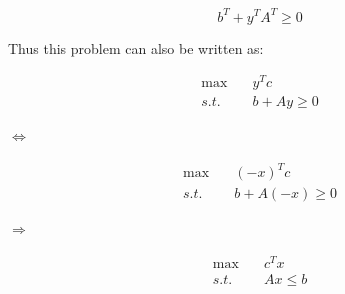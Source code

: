 \begin{equation*}
b^T+y^TA^T \geq 0
\end{equation*}

Thus this problem can also be written as:


\begin{align*}
\max\quad &y^Tc\\
s.t.\quad &b+Ay \geq 0
\end{align*}

$\Leftrightarrow$

\begin{align*}
\max\quad &(-x)^Tc\\
s.t.\quad &b+A(-x) \geq 0
\end{align*}

$\Rightarrow$

\begin{align*}
\max\quad &c^Tx\\
s.t.\quad &Ax \leq b
\end{align*}

